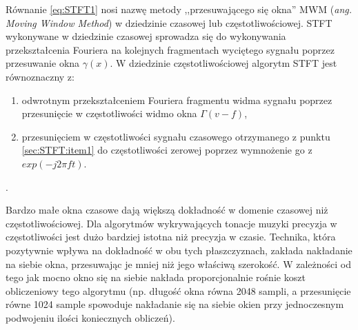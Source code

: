 \documentclass[12pt,a4paper,twoside]{mwart}
\begin{document}
Równanie \ref{eq:STFT1} nosi nazwę metody ,,przesuwającego się okna'' MWM (\textit{ang. Moving Window Method}) w dziedzinie czasowej lub częstotliwościowej. STFT wykonywane w dziedzinie czasowej sprowadza się do wykonywania przekształcenia Fouriera na kolejnych fragmentach wyciętego sygnału poprzez przesuwanie okna $\gamma(x)$. W dziedzinie częstotliwościowej algorytm STFT jest równoznaczny z:
\begin{enumerate}
  \item \label{sec:STFT:item1}odwrotnym przekształceniem Fouriera fragmentu widma sygnału poprzez przesunięcie w częstotliwości widmo okna $\Gamma(v -f)$,
  \item przesunięciem w częstotliwości sygnału czasowego otrzymanego z punktu \ref{sec:STFT:item1} do częstotliwości zerowej poprzez wymnożenie go z $exp(-j2 \pi ft)$.
\end{enumerate}
\cite[455-458]{CyfrowePrzetwarzanieSygnalowOdTeoriiDoZastosowan}
.

Bardzo małe okna czasowe dają większą dokładność w domenie czasowej niż częstotliwościowej. Dla algorytmów wykrywających tonacje muzyki precyzja w częstotliwości jest dużo bardziej istotna niż precyzja w czasie. Technika, która pozytywnie wpływa na dokładność w obu tych płaszczyznach, zakłada nakładanie na siebie okna, przesuwając je mniej niż jego właściwą szerokość. W zależności od tego jak mocno okno się na siebie nakłada proporcjonalnie rośnie koszt obliczeniowy tego algorytmu (np. długość okna równa 2048 sampli, a przesunięcie równe 1024 sample spowoduje nakładanie się na siebie okien przy jednoczesnym podwojeniu ilości koniecznych obliczeń). 
\end{document}
